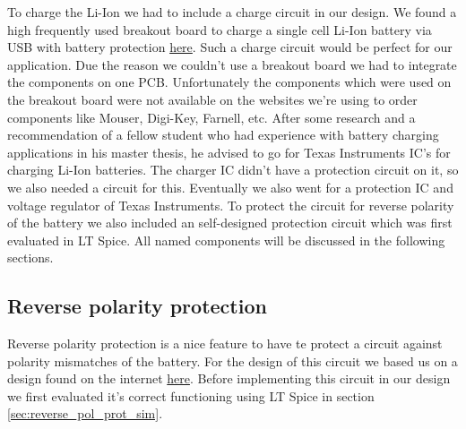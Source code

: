 \documentclass[11pt,a4paper]{article}
\begin{document}
To charge the Li-Ion we had to include a charge circuit in our design. We found a high frequently used breakout board to charge a single cell Li-Ion battery via USB with battery protection \href{http://acoptex.com/project/9446/basics-project-082a-lithum-battery-charger-tp4056-at-acoptexcom/#sthash.3qJ5RSCy.AsMaJFMH.dpbs}{here}. Such a charge circuit would be perfect for our application. Due the reason we couldn't use a breakout board we had to integrate the components on one PCB. Unfortunately the components which were used on the breakout board were not available on the websites we're using to order components like Mouser, Digi-Key, Farnell, etc. After some research and a recommendation of a fellow student who had experience with battery charging applications in his master thesis, he advised to go for Texas Instruments IC's for charging Li-Ion batteries. The charger IC didn't have a protection circuit on it, so we also needed a circuit for this. Eventually we also went for a protection IC and voltage regulator of Texas Instruments. To protect the circuit for reverse polarity of the battery we also included an self-designed protection circuit which was first evaluated in LT Spice. All named components will be discussed in the following sections.

\subsection{Reverse polarity protection}
Reverse polarity protection is a nice feature to have te protect a circuit against polarity mismatches of the battery. For the design of this circuit we based us on a design found on the internet \href{http://kaktuscircuits.blogspot.com/2014/07/reverse-polarity-and-overvoltage.html}{here}. Before implementing this circuit in our design we first evaluated it's correct functioning using LT Spice in section \ref{sec:reverse_pol_prot_sim}.
\end{document}
